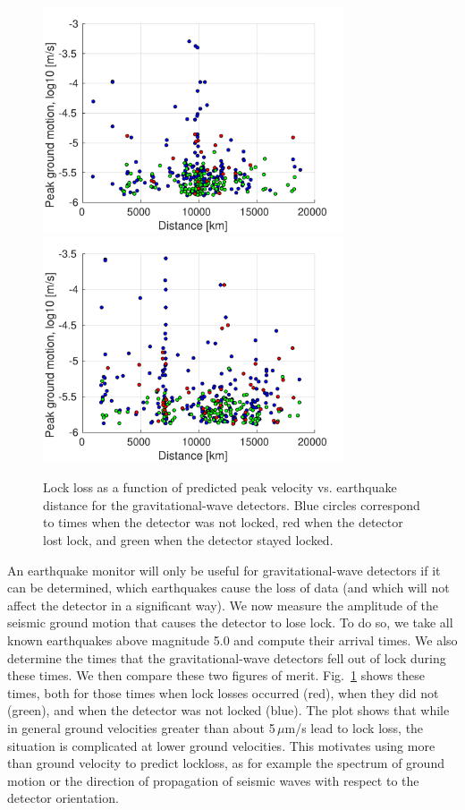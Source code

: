 \documentclass[reprint, prl, aps, showpacs]{revtex4-1}
\begin{document}
\begin{figure}[t]
\hspace*{-0.5cm}
 \includegraphics[width=3.5in]{lockloss_vel_distance_LHO.pdf}
  \includegraphics[width=3.5in]{lockloss_vel_distance_LLO.pdf}
 \caption{Lock loss as a function of predicted peak velocity vs. earthquake distance for the gravitational-wave detectors. Blue circles correspond to times when the detector was not locked, red when the detector lost lock, and green when the detector stayed locked.}
 \label{fig:lockloss}
\end{figure}

An earthquake monitor will only be useful for gravitational-wave detectors if it can be determined, which earthquakes cause the loss of data (and which will not affect the detector in a significant way).
We now measure the amplitude of the seismic ground motion that causes the detector to lose lock. To do so, we take all known earthquakes above magnitude 5.0 and compute their arrival times. 
We also determine the times that the gravitational-wave detectors fell out of lock during these times. 
We then compare these two figures of merit. 
Fig.~\ref{fig:lockloss} shows these times, both for those times when lock losses occurred (red), when they did not (green), and when the detector was not locked (blue). 
The plot shows that while in general ground velocities greater than about 5\,$\mu$m/s lead to lock loss, the situation is complicated at lower ground velocities. This motivates using more than ground velocity to predict lockloss, as for example the spectrum of ground motion or the direction of propagation of seismic waves with respect to the detector orientation.
\end{document}
